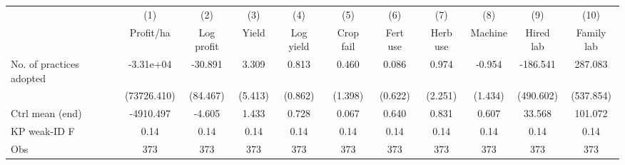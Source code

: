 {
\def\sym#1{\ifmmode^{#1}\else\(^{#1}\)\fi}
\begin{tabular}{l*{10}{c}}
\toprule
                    &\multicolumn{1}{c}{(1)}&\multicolumn{1}{c}{(2)}&\multicolumn{1}{c}{(3)}&\multicolumn{1}{c}{(4)}&\multicolumn{1}{c}{(5)}&\multicolumn{1}{c}{(6)}&\multicolumn{1}{c}{(7)}&\multicolumn{1}{c}{(8)}&\multicolumn{1}{c}{(9)}&\multicolumn{1}{c}{(10)}\\
                    &\multicolumn{1}{c}{Profit/ha}&\multicolumn{1}{c}{Log profit}&\multicolumn{1}{c}{Yield}&\multicolumn{1}{c}{Log yield}&\multicolumn{1}{c}{Crop fail}&\multicolumn{1}{c}{Fert use}&\multicolumn{1}{c}{Herb use}&\multicolumn{1}{c}{Machine}&\multicolumn{1}{c}{Hired lab}&\multicolumn{1}{c}{Family lab}\\
\midrule
No. of practices adopted&   -3.31e+04         &     -30.891         &       3.309         &       0.813         &       0.460         &       0.086         &       0.974         &      -0.954         &    -186.541         &     287.083         \\
                    & (73726.410)         &    (84.467)         &     (5.413)         &     (0.862)         &     (1.398)         &     (0.622)         &     (2.251)         &     (1.434)         &   (490.602)         &   (537.854)         \\
\midrule
Ctrl mean (end)     &   -4910.497         &      -4.605         &       1.433         &       0.728         &       0.067         &       0.640         &       0.831         &       0.607         &      33.568         &     101.072         \\
KP weak-ID F        &        0.14         &        0.14         &        0.14         &        0.14         &        0.14         &        0.14         &        0.14         &        0.14         &        0.14         &        0.14         \\
Obs                 &         373         &         373         &         373         &         373         &         373         &         373         &         373         &         373         &         373         &         373         \\
\bottomrule
\end{tabular}
}
